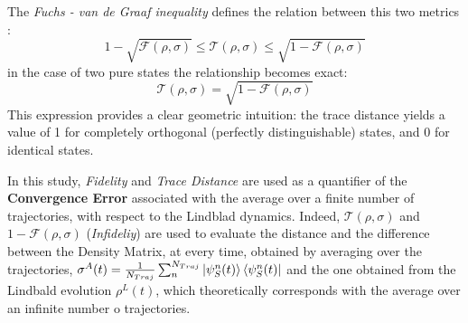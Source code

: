 \documentclass[a4paper,12pt]{article}
\begin{document}
The \textit{Fuchs - van de Graaf inequality} defines the relation between this two metrics : 
\begin{equation}
	1 - \sqrt{\mathcal{F} \left( \rho, \sigma \right)} \leq \mathcal{T} \left( \rho, \sigma \right) \leq \sqrt{1 - \mathcal{F} \left( \rho, \sigma \right)}
\end{equation}
in the case of two pure states the relationship becomes exact:
\begin{equation}
	\mathcal{T} \left( \rho, \sigma \right)  = \sqrt{1 - \mathcal{F} \left( \rho, \sigma \right) }
\end{equation}
This expression provides a clear geometric intuition: the trace distance yields a value of 1 for completely orthogonal (perfectly distinguishable) states, and 0 for identical states.

\newpage
 
In this study, \textit{Fidelity} and \textit{Trace Distance} are used as a quantifier of the \textbf{Convergence Error} associated with the average over a finite number of trajectories, with respect to the Lindblad dynamics. Indeed, $ \mathcal{T} \left( \rho, \sigma \right) $ and $ 1 - \mathcal{F} \left( \rho, \sigma \right) $ (\textit{Infideliy}) are used to evaluate the distance and the difference between the Density Matrix, at every time, obtained by averaging over the trajectories, $ \sigma^{A} (t) = \frac{1}{N_{Traj}} \sum_{n}^{N_{Traj}}{\ket{\psi_{S}^{n}(t)}\bra{\psi_{S}^{n}(t)}} $ and the one obtained from the Lindbald evolution $ \rho^{L} (t) $, which theoretically corresponds with the average over an infinite number o trajectories.
\end{document}
